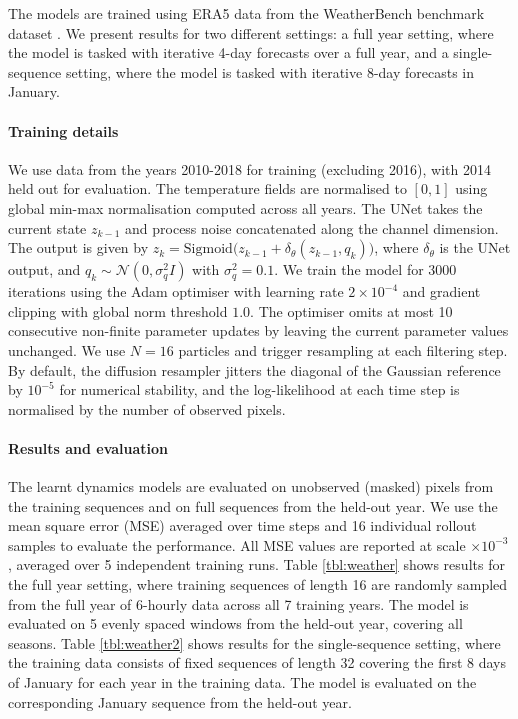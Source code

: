 \documentclass{article}
\begin{document}
The models are trained using ERA5 data from the WeatherBench benchmark dataset \citep{Rasp2020WeatherBench}. We present results for two different settings: a full year setting, where the model is tasked with iterative 4-day forecasts over a full year, and a single-sequence setting, where the model is tasked with iterative 8-day forecasts in January. 

\paragraph{Training details}
We use data from the years 2010-2018 for training (excluding 2016), with 2014 held out for evaluation. The temperature fields are normalised to $[0, 1]$ using global min-max normalisation computed across all years. The UNet takes the current state $z_{k-1}$ and process noise concatenated along the channel dimension. The output is given by $z_k = \mathrm{Sigmoid}\bigl(z_{k-1} + \delta_\theta(z_{k-1}, q_k)\bigr)$, where $\delta_\theta$ is the UNet output, and $q_k \sim \mathcal{N}(0, \sigma_q^2 I)$ with $\sigma_q^2 = 0.1$. We train the model for 3000 iterations using the Adam optimiser with learning rate $2 \times 10^{-4}$ and gradient clipping with global norm threshold $1.0$. The optimiser omits at most 10 consecutive non-finite parameter updates by leaving the current parameter values unchanged. We use $N=16$ particles and trigger resampling at each filtering step. By default, the diffusion resampler jitters the diagonal of the Gaussian reference by $10^{-5}$ for numerical stability, and the log-likelihood at each time step is normalised by the number of observed pixels.

\paragraph{Results and evaluation}
The learnt dynamics models are evaluated on unobserved (masked) pixels from the training sequences and on full sequences from the held-out year. We use the mean square error (MSE) averaged over time steps and 16 individual rollout samples to evaluate the performance. All MSE values are reported at scale $\times 10^{-3}$, averaged over 5 independent training runs. Table \ref{tbl:weather} shows results for the full year setting, where training sequences of length 16 are randomly sampled from the full year of 6-hourly data across all 7 training years. The model is evaluated on 5 evenly spaced windows from the held-out year, covering all seasons. Table \ref{tbl:weather2} shows results for the single-sequence setting, where the training data consists of fixed sequences of length 32 covering the first 8 days of January for each year in the training data. The model is evaluated on the corresponding January sequence from the held-out year.
\end{document}
